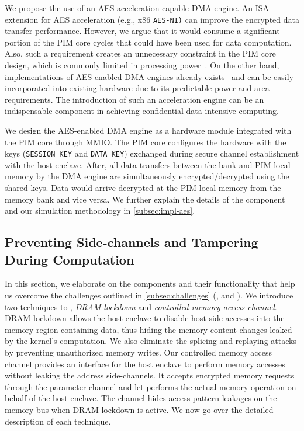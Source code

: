  We propose the use of an AES-acceleration-capable DMA engine. An ISA extension for AES acceleration (e.g., x86 \texttt{AES-NI)} can improve the encrypted data transfer performance. However, we argue that it would consume a significant portion of the PIM core cycles that could have been used for data computation. Also, such a requirement creates an unnecessary constraint in the PIM core design, which is commonly limited in processing power~\cite{upmem-atc}. On the other hand, implementations of AES-enabled DMA engines already exists~\cite{nxp,advanced-dma-controller} and can be easily incorporated into existing hardware due to its predictable power and area requirements. The introduction of such an acceleration engine can be an indispensable component in achieving confidential data-intensive computing. 

We design the AES-enabled DMA engine as a hardware module integrated with the PIM core through MMIO. The PIM core configures the hardware with the keys (\texttt{SESSION\_KEY} and \texttt{DATA\_KEY}) exchanged during secure channel establishment with the host enclave. After, all data transfers between the bank and PIM local memory by the DMA engine are simultaneously encrypted/decrypted using the shared keys. Data would arrive decrypted at the PIM local memory from the memory bank and vice versa. We further explain the details of the component and our simulation methodology in \cref{subsec:impl-aes}.


\subsection{Preventing Side-channels and Tampering During Computation}
\label{subsec:side-channels}

In this section, we elaborate on the components and their functionality that help us overcome the challenges outlined in \cref{subsec:challenges} (,  and ). We introduce two techniques to \baseline, \emph{DRAM lockdown} and \emph{controlled memory access channel}. DRAM lockdown allows the host enclave to disable host-side accesses into the memory region containing data, thus hiding the memory content changes leaked by the \thename kernel's computation. We also eliminate the splicing and replaying attacks by preventing unauthorized memory writes. Our controlled memory access channel provides an interface for the host enclave to perform memory accesses without leaking the address side-channels. It accepts encrypted memory requests through the parameter channel and let \thename performs the actual memory operation on behalf of the host enclave. The channel hides access pattern leakages on the memory bus when DRAM lockdown is active. We now go over the detailed description of each technique.

